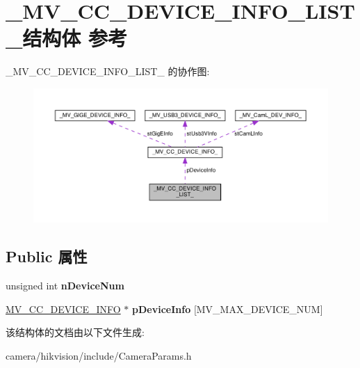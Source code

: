 \hypertarget{struct___m_v___c_c___d_e_v_i_c_e___i_n_f_o___l_i_s_t__}{}\section{\+\_\+\+M\+V\+\_\+\+C\+C\+\_\+\+D\+E\+V\+I\+C\+E\+\_\+\+I\+N\+F\+O\+\_\+\+L\+I\+S\+T\+\_\+结构体 参考}
\label{struct___m_v___c_c___d_e_v_i_c_e___i_n_f_o___l_i_s_t__}


\+\_\+\+M\+V\+\_\+\+C\+C\+\_\+\+D\+E\+V\+I\+C\+E\+\_\+\+I\+N\+F\+O\+\_\+\+L\+I\+S\+T\+\_\+ 的协作图\+:\nopagebreak
\begin{figure}[H]
\begin{center}
\leavevmode
\includegraphics[width=350pt]{struct___m_v___c_c___d_e_v_i_c_e___i_n_f_o___l_i_s_t____coll__graph}
\end{center}
\end{figure}
\subsection*{Public 属性}
\begin{DoxyCompactItemize}
\item 
\mbox{\label{struct___m_v___c_c___d_e_v_i_c_e___i_n_f_o___l_i_s_t___a04f70da14607d5d77ae965a077a7c9f8}} 
unsigned int {\bfseries n\+Device\+Num}
\item 
\mbox{\label{struct___m_v___c_c___d_e_v_i_c_e___i_n_f_o___l_i_s_t___a9824f768565aa8e75ddf27f80273f706}} 
\hyperlink{struct___m_v___c_c___d_e_v_i_c_e___i_n_f_o__}{M\+V\+\_\+\+C\+C\+\_\+\+D\+E\+V\+I\+C\+E\+\_\+\+I\+N\+FO} $\ast$ {\bfseries p\+Device\+Info} \mbox{[}M\+V\+\_\+\+M\+A\+X\+\_\+\+D\+E\+V\+I\+C\+E\+\_\+\+N\+UM\mbox{]}
\end{DoxyCompactItemize}


该结构体的文档由以下文件生成\+:\begin{DoxyCompactItemize}
\item 
camera/hikvision/include/Camera\+Params.\+h\end{DoxyCompactItemize}
